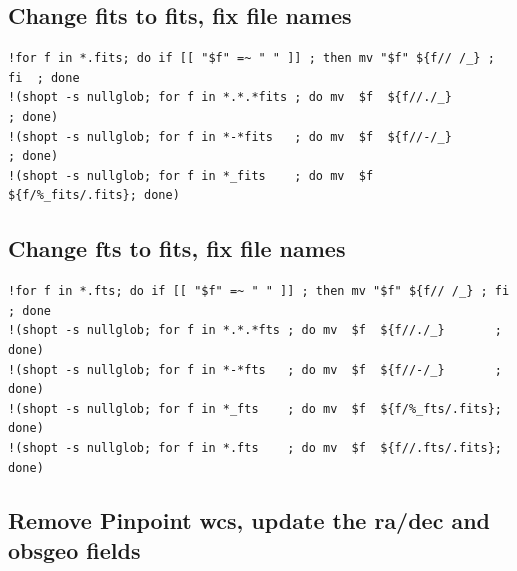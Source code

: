 \documentclass[letter,11pt,oneside]{article}
\begin{document}
\subsection{Change fits to fits, fix file names}

{\color{verbcolor}
\begin{verbatim}
!for f in *.fits; do if [[ "$f" =~ " " ]] ; then mv "$f" ${f// /_} ; fi  ; done
!(shopt -s nullglob; for f in *.*.*fits ; do mv  $f  ${f//./_}        ; done)
!(shopt -s nullglob; for f in *-*fits   ; do mv  $f  ${f//-/_}        ; done)
!(shopt -s nullglob; for f in *_fits    ; do mv  $f  ${f/%_fits/.fits}; done)
\end{verbatim}
}

\subsection{Change fts to fits, fix file names}

{\color{verbcolor}
\begin{verbatim}
!for f in *.fts; do if [[ "$f" =~ " " ]] ; then mv "$f" ${f// /_} ; fi ; done
!(shopt -s nullglob; for f in *.*.*fts ; do mv  $f  ${f//./_}       ; done)
!(shopt -s nullglob; for f in *-*fts   ; do mv  $f  ${f//-/_}       ; done)
!(shopt -s nullglob; for f in *_fts    ; do mv  $f  ${f/%_fts/.fits}; done)
!(shopt -s nullglob; for f in *.fts    ; do mv  $f  ${f//.fts/.fits}; done)
\end{verbatim}
}
\clearpage
\subsection{Remove Pinpoint wcs, update the ra/dec and obsgeo fields}
\end{document}

